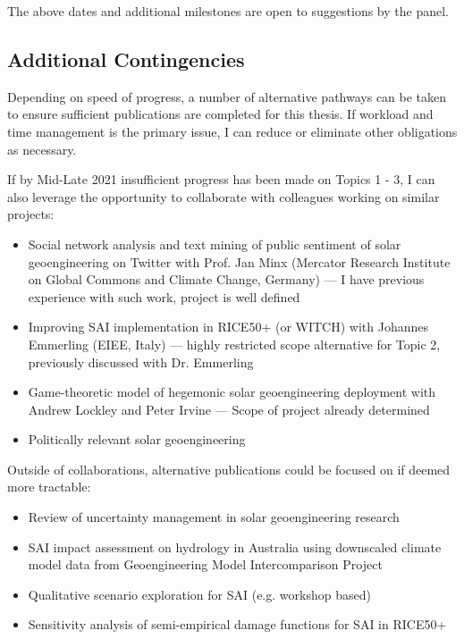 \documentclass{article}
\begin{document}
The above dates and additional milestones are open to suggestions by the panel.

\subsection*{Additional Contingencies}
Depending on speed of progress, a number of alternative pathways can be taken to ensure sufficient publications are completed for this thesis. If workload and time management is the primary issue, I can reduce or eliminate other obligations as necessary.\medskip

If by Mid-Late 2021 insufficient progress has been made on Topics 1 - 3, I can also leverage the opportunity to collaborate with colleagues working on similar projects:

\begin{itemize}
    \item Social network analysis and text mining of public sentiment of solar geoengineering on Twitter with Prof. Jan Minx (Mercator Research Institute on Global Commons and Climate Change, Germany) --- I have previous experience with such work, project is well defined
    \item Improving SAI implementation in RICE50+ (or WITCH) with Johannes Emmerling (EIEE, Italy) --- highly restricted scope alternative for Topic 2, previously discussed with Dr. Emmerling
    \item Game-theoretic model of hegemonic solar geoengineering deployment with Andrew Lockley and Peter Irvine --- Scope of project already determined
    \item Politically relevant solar geoengineering 
\end{itemize}

Outside of collaborations, alternative publications could be focused on if deemed more tractable:

\begin{itemize}
    \item Review of uncertainty management in solar geoengineering research
    \item SAI impact assessment on hydrology in Australia using downscaled climate model data from Geoengineering Model Intercomparison Project
    \item Qualitative scenario exploration for SAI (e.g. workshop based)
    \item Sensitivity analysis of semi-empirical damage functions for SAI in RICE50+
\end{itemize}
\end{document}
